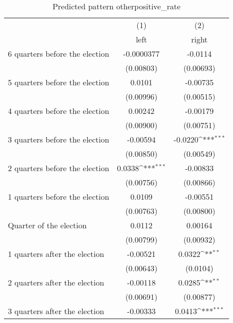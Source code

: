 \begin{table}[htbp]\centering
\def\sym#1{\ifmmode^{#1}\else\(^{#1}\)\fi}
\caption{Predicted pattern otherpositive\_rate}
\begin{tabular}{l*{2}{c}}
\hline\hline
                    &\multicolumn{1}{c}{(1)}&\multicolumn{1}{c}{(2)}\\
                    &\multicolumn{1}{c}{left}&\multicolumn{1}{c}{right}\\
\hline
 6 quarters before the election&  -0.0000377         &     -0.0114         \\
                    &   (0.00803)         &   (0.00693)         \\
[1em]
 5 quarters before the election&      0.0101         &    -0.00735         \\
                    &   (0.00996)         &   (0.00515)         \\
[1em]
 4 quarters before the election&     0.00242         &    -0.00179         \\
                    &   (0.00900)         &   (0.00751)         \\
[1em]
 3 quarters before the election&    -0.00594         &     -0.0220\sym{***}\\
                    &   (0.00850)         &   (0.00549)         \\
[1em]
 2 quarters before the election&      0.0338\sym{***}&    -0.00833         \\
                    &   (0.00756)         &   (0.00866)         \\
[1em]
 1 quarters before the election&      0.0109         &    -0.00551         \\
                    &   (0.00763)         &   (0.00800)         \\
[1em]
Quarter of the election&      0.0112         &     0.00164         \\
                    &   (0.00799)         &   (0.00932)         \\
[1em]
 1 quarters after the election&    -0.00521         &      0.0322\sym{**} \\
                    &   (0.00643)         &    (0.0104)         \\
[1em]
 2 quarters after the election&    -0.00118         &      0.0285\sym{**} \\
                    &   (0.00691)         &   (0.00877)         \\
[1em]
 3 quarters after the election&    -0.00333         &      0.0413\sym{***}\\

\end{tabular}
\end{table}
